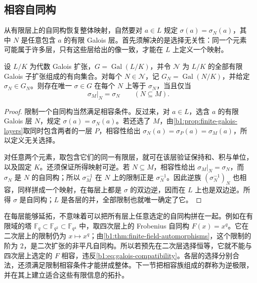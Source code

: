 \subsection{相容自同构}
\label{b1:subsec:2201:03}
从有限层上的自同构恢复整体映射，自然要对 \(a\in L\) 规定 \(\sigma(a)=\sigma_N(a)\)，其中 \(N\) 是任意包含 \(a\) 的有限 Galois 层。首先须解决的是选择无关性：同一个元素可能属于许多层，只有这些层给出的像一致，才能在 \(L\) 上定义一个映射。

\begin{proposition}\label{b1:prop:galois-compatible-family}
	设 \(L/K\) 为代数 Galois 扩张，\(G=\operatorname{Gal}(L/K)\)，并令 \(\mathcal N\) 为 \(L/K\) 的全部有限 Galois 子扩张组成的有向集合。对每个 \(N\in\mathcal N\)，记 \(G_N=\operatorname{Gal}(N/K)\)，并给定 \(\sigma_N\in G_N\)。则存在唯一 \(\sigma\in G\) 在每个 \(N\) 上等于 \(\sigma_N\)，当且仅当
	\begin{equation}\label{b1:eq:galois-compatibility}
		\sigma_M|_N=\sigma_N\qquad(N\subseteq M).
	\end{equation}
\end{proposition}
\begin{proof}
	限制一个自同构当然满足相容条件。反过来，对 \(a\in L\)，选含 \(a\) 的有限 Galois 层 \(N\)，规定 \(\sigma(a)=\sigma_N(a)\)。若还选了 \(M\)，由\cref{b1:prop:finite-galois-layers}取同时包含两者的一层 \(P\)，相容性给出 \(\sigma_N(a)=\sigma_P(a)=\sigma_M(a)\)，所以定义无关选择。

	对任意两个元素，取包含它们的同一有限层，就可在该层验证保持和、积与单位，以及固定 \(K\)。还须保证所得映射可逆。若 \(N\subseteq M\)，相容性给出 \(\sigma_M|_N=\sigma_N\)，而 \(\sigma_N\) 是 \(N\) 的自同构；所以 \(\sigma_M^{-1}\) 在 \(N\) 上的限制正是 \(\sigma_N^{-1}\)。因此逆族 \((\sigma_N^{-1})_N\) 也相容，同样拼成一个映射，在每层上都是 \(\sigma\) 的双边逆，因而在 \(L\) 上也是双边逆。所得 \(\sigma\) 是自同构；\(L\) 是各层的并，全部限制也就唯一确定了它。
\end{proof}
在每层能够延拓，不意味着可以把所有层上任意选定的自同构拼在一起。例如在有限域的塔 \(\mathbb F_q\subset\mathbb F_{q^2}\subset\mathbb F_{q^4}\) 中，取四次层上的 Frobenius 自同构 \(F(x)=x^q\)。它在二次层上的限制仍为 \(x\mapsto x^q\)；由\cref{b1:thm:finite-field-automorphisms}，这个限制的阶为 \(2\)，是二次扩张的非平凡自同构。所以若预先在二次层选择恒等，它就不能与四次层上选定的 \(F\) 相容，违反\eqref{b1:eq:galois-compatibility}。各层的选择分别合法，还须满足限制相容条件才能拼成整体。下一节把相容族组成的群称为逆极限，并在其上建立适合这些有限信息的拓扑。
